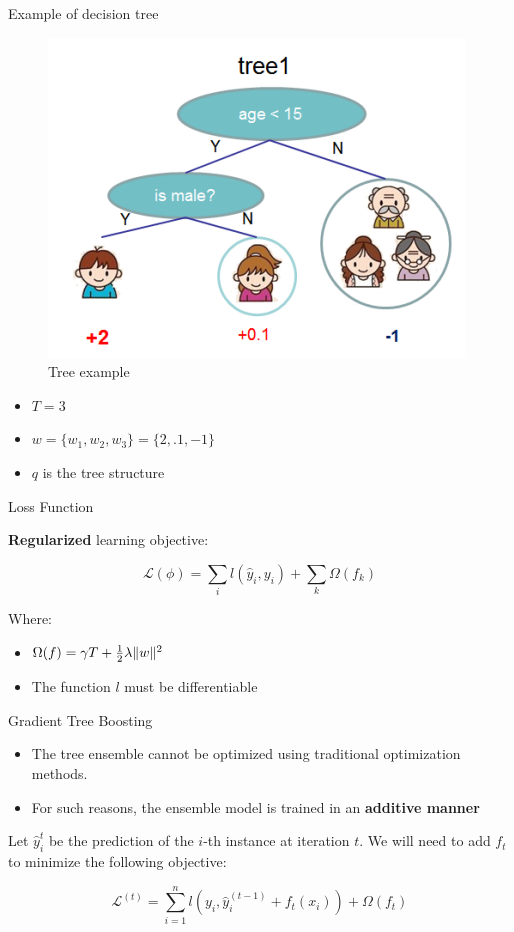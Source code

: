 \documentclass{beamer}
\DeclarePairedDelimiter\norm{\lVert}{\rVert}%
\begin{document}
\begin{frame}{Example of decision tree}
	
\begin{figure}
	\centering
	\includegraphics[width=.7\linewidth]{img/tree_example}
	\caption{Tree example}
\end{figure}
\begin{itemize}
	\item $T = 3$
	\item $w = \{w_1, w_2, w_3\} = \{2, .1, -1\}$
	\item $q$ is the tree structure
\end{itemize}	

\end{frame}

\begin{frame}{Loss Function}

	\textbf{Regularized} learning objective:
	
	\begin{equation}
		\mathcal{L}(\phi) = \sum_i l(\hat{y}_i, y_i) + \sum_k \Omega(f_k)
	\end{equation}

	Where:
	\begin{itemize}
			\item $ \Omega(f) = \gamma T + \frac{1}{2} \lambda \norm{w}^2$
			\item The function $l$ must be differentiable
	\end{itemize}

\end{frame}

\begin{frame}{Gradient Tree Boosting}
	
	\begin{itemize}
		\item The tree ensemble cannot be optimized using traditional optimization methods.
		\item For such reasons, the ensemble model is trained in an \textbf{additive manner}
	\end{itemize}
	
	Let $\hat{y}_i^t$ be the prediction of the $i$-th instance at iteration $t$. We will need to add $f_t$ to minimize the following objective:
	
	\begin{equation*}
	\mathcal{L}^{(t)} = \sum_{i=1}^{n} l(y_i, \hat{y}_i^{(t-1)} + f_t(x_i)) + \Omega(f_t)
	\end{equation*}

\end{frame}
\end{document}

